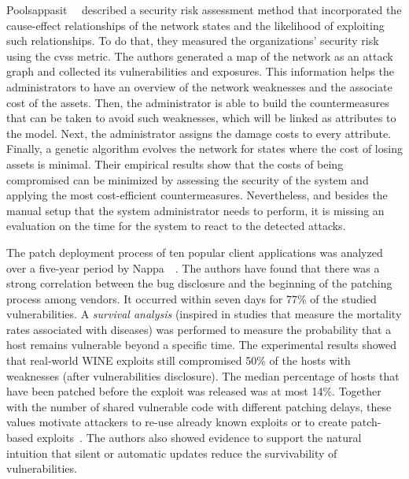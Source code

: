 Poolsappasit~\etal{}~\cite{Poolsappasit:2012} described a security risk assessment method that incorporated the cause-effect relationships of the network states and the likelihood of exploiting such relationships.
To do that, they measured the organizations' security risk using the \gls{cvss} metric.
The authors generated a map of the network as an attack graph and collected its vulnerabilities and exposures. 
This information helps the administrators to have an overview of the network weaknesses and the associate cost of the assets.
Then, the administrator is able to build the countermeasures that can be taken to avoid such weaknesses, which will be linked as attributes to the model.
Next, the administrator assigns the damage costs to every attribute.
Finally, a genetic algorithm evolves the network for states where the cost of losing assets is minimal. 
Their empirical results show that the costs of being compromised can be minimized by assessing the security of the system and applying the most cost-efficient countermeasures.
Nevertheless, and besides the manual setup that the system administrator needs to perform, it is missing an evaluation on the time for the system to react to the detected attacks.


The patch deployment process of ten popular client applications was analyzed over a five-year period by Nappa~\etal{}~\cite{Nappa:2015}.
The authors have found that there was a strong correlation between the bug disclosure and the beginning of the patching process among vendors.
It occurred within seven days for 77\% of the studied vulnerabilities.
A \emph{survival analysis} (inspired in studies that measure the mortality rates associated with diseases) was performed to measure the probability that a host remains vulnerable beyond a specific time.
The experimental results showed that real-world WINE exploits still compromised 50\% of the hosts with weaknesses (after vulnerabilities disclosure). 
The median percentage of hosts that have been patched before the exploit was released was at most 14\%.
Together with the number of shared vulnerable code with different patching delays, these values motivate attackers to re-use already known exploits or to create patch-based exploits~\cite{Brumley:2008}.
The authors also showed evidence to support the natural intuition that silent or automatic updates reduce the survivability of vulnerabilities. 


